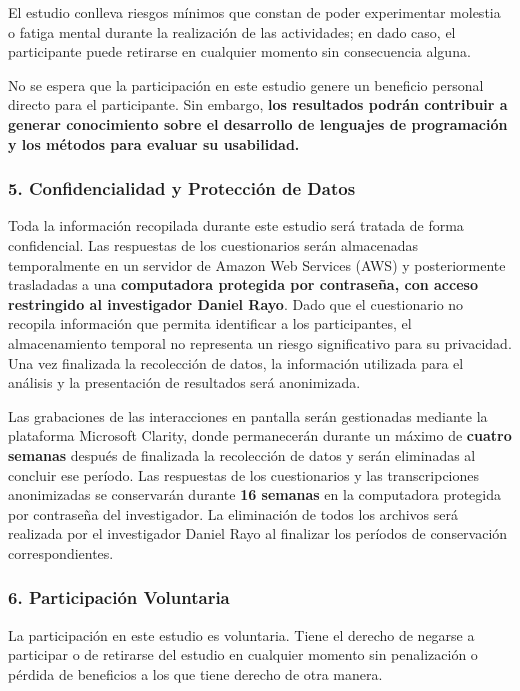 El estudio conlleva riesgos mínimos que constan de poder experimentar molestia o fatiga mental durante la realización de las actividades; en dado caso, el participante puede retirarse en cualquier momento sin consecuencia alguna.

No se espera que la participación en este estudio genere un beneficio personal directo para el participante. Sin embargo, \textbf{los resultados podrán contribuir a generar conocimiento sobre el desarrollo de lenguajes de programación y los métodos para evaluar su usabilidad.}

\subsubsection{5. Confidencialidad y Protección de Datos}

Toda la información recopilada durante este estudio será tratada de forma confidencial. Las respuestas de los cuestionarios serán almacenadas temporalmente en un servidor de Amazon Web Services (AWS) y posteriormente trasladadas a una \textbf{computadora protegida por contraseña, con acceso restringido al investigador Daniel Rayo}. Dado que el cuestionario no recopila información que permita identificar a los participantes, el almacenamiento temporal no representa un riesgo significativo para su privacidad. Una vez finalizada la recolección de datos, la información utilizada para el análisis y la presentación de resultados será anonimizada.

Las grabaciones de las interacciones en pantalla serán gestionadas mediante la plataforma Microsoft Clarity, donde permanecerán durante un máximo de \textbf{cuatro semanas} después de finalizada la recolección de datos y serán eliminadas al concluir ese período. Las respuestas de los cuestionarios y las transcripciones anonimizadas se conservarán durante \textbf{16 semanas} en la computadora protegida por contraseña del investigador. La eliminación de todos los archivos será realizada por el investigador Daniel Rayo al finalizar los períodos de conservación correspondientes.

\subsubsection{6. Participación Voluntaria}

La participación en este estudio es voluntaria. Tiene el derecho de negarse a participar o de
retirarse del estudio en cualquier momento sin penalización o pérdida de beneficios a los que
tiene derecho de otra manera.

